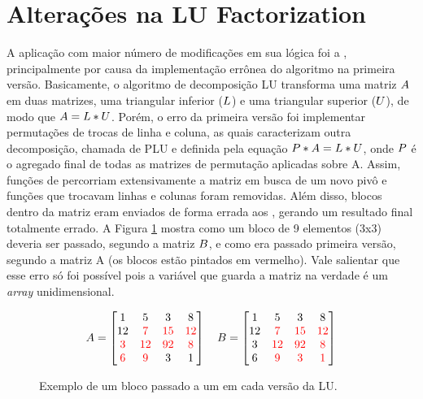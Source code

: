 \section{Alterações na LU Factorization}
\label{sec:alteracoeslu}

A aplicação com maior número de modificações em sua lógica foi a \textit{\LU}, principalmente por causa da implementação errônea do algoritmo na primeira versão. Basicamente, o algoritmo de decomposição LU transforma uma matriz $\mathnormal{A}$ em duas matrizes, uma triangular inferior ($\mathnormal{L}$) e uma triangular superior ($\mathnormal{U}$), de modo que $\mathnormal{A = L * U}$. Porém, o erro da primeira versão foi implementar permutações de trocas de linha e coluna, as quais caracterizam outra decomposição, chamada de PLU e definida pela equação $\mathnormal{P * A = L * U}$, onde $\mathnormal{P}$ é o agregado final de todas as matrizes de permutação aplicadas sobre A. Assim, funções de percorriam extensivamente a matriz em busca de um novo pivô e funções que trocavam linhas e colunas foram removidas. Além disso, blocos dentro da matriz eram enviados de forma errada aos \slaves, gerando um resultado final totalmente errado. A Figura \ref{fig:rightandwrongblocks} mostra como um bloco de 9 elementos (3x3) deveria ser passado, segundo a matriz $\mathnormal{B}$, e como era passado primeira versão, segundo a matriz {A} (os blocos estão pintados em vermelho). Vale salientar que esse erro só foi possível pois a variável que guarda a matriz na verdade é um \textit{array} unidimensional.

\begin{figure}[h]
  \centering
  \caption{Exemplo de um bloco passado a um \slave em cada versão da LU.}
  \label{fig:rightandwrongblocks}
  \[
    A=
    \begin{bmatrix}
      1  & 5  & 3  & 8  \\
      12 & \color{red} 7  & \color{red} 15 & \color{red} 12 \\
      \color{red}  3  & \color{red}  12 & \color{red}  92 & \color{red} 8 \\
      \color{red}  6  & \color{red}  9  & 3  & 1 
    \end{bmatrix}\quad
    B=
    \begin{bmatrix}
      1  & 5  & 3  & 8  \\
      12 & \color{red} 7  & \color{red} 15 & \color{red} 12 \\
      3  & \color{red} 12 & \color{red} 92 & \color{red} 8 \\
      6  & \color{red} 9  & \color{red} 3  & \color{red} 1 
    \end{bmatrix}
  \]
\end{figure}

